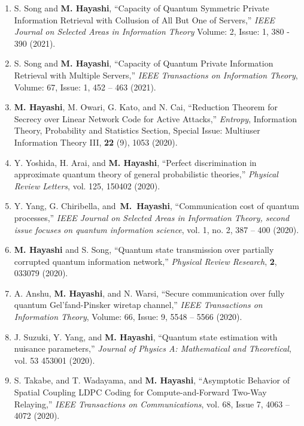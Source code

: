 \documentclass[a4paper,12pt,oneside]{article}
\begin{document}
\begin{enumerate}
\item  
S. Song and \textbf{M. Hayashi},
``Capacity of Quantum Symmetric Private Information Retrieval with Collusion of All But One of Servers,''
{\em IEEE Journal on Selected Areas in Information Theory}
Volume: 2, Issue: 1, 380 - 390 (2021).

\item  
S. Song and \textbf{M. Hayashi},
``Capacity of Quantum Private Information Retrieval with Multiple Servers,''
{\em IEEE Transactions on Information Theory}, 
Volume: 67, Issue: 1, 452 -- 463 (2021). 

\item  
\textbf{M. Hayashi}, M. Owari, G. Kato, and N. Cai,
``Reduction Theorem for Secrecy over Linear Network
Code for Active Attacks,''
{\em Entropy}, Information Theory, Probability and Statistics Section, Special Issue: Multiuser Information Theory III,  
{\bf 22} (9), 1053 (2020).

\item  
Y. Yoshida, H. Arai, and \textbf{M. Hayashi},
``Perfect discrimination in approximate quantum theory of general probabilistic theories,''
{\em Physical Review Letters}, 
vol. 125, 150402 (2020).

\item  
Y. Yang, G. Chiribella,  and~\textbf{M.~Hayashi},
``Communication cost of quantum processes,''
{\em IEEE Journal on Selected Areas in Information Theory, second issue focuses on quantum information science},
vol. 1, no. 2, 387 -- 400 (2020).
 
\item  
\textbf{M. Hayashi} and S. Song,
``Quantum state transmission over partially corrupted quantum information network,''
{\em Physical Review Research},  {\bf 2}, 033079 (2020).

\item  
A. Anshu, \textbf{M. Hayashi}, and N. Warsi,   
``Secure communication over fully quantum Gel'fand-Pinsker wiretap channel,''
{\em IEEE Transactions on Information Theory}, 
Volume: 66, Issue: 9, 5548 -- 5566 (2020). 

\item  
J. Suzuki, Y. Yang, and \textbf{M. Hayashi},
``Quantum state estimation with nuisance parameters,'' 
{\em Journal of Physics A: Mathematical and Theoretical}, 
vol. 53 453001 (2020). 

\item  
S. Takabe, and T. Wadayama, and \textbf{M. Hayashi}, 
``Asymptotic Behavior of Spatial Coupling LDPC Coding for Compute-and-Forward Two-Way Relaying,''
{\em IEEE Transactions on Communications},
vol. 68, Issue 7, 4063 -- 4072 (2020).


\end{enumerate}
\end{document}
